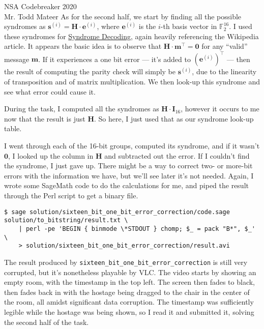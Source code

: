\documentclass{letter}
\begin{document}
\begin{letter}{NSA Codebreaker 2020\\Mr. Todd Mateer}
As for the second half, we start by finding all the possible syndromes as
\(\mathbf{s}^{(i)}=\mathbf{H}\cdot\mathbf{e}^{(i)}\), where \(\mathbf{e}^{(i)}\)
is the \(i\)-th basis vector in \(\mathbb{F}_2^{16}\). I used these syndromes
for \href{https://en.wikipedia.org/wiki/Decoding_methods#Syndrome_decoding}
{Syndrome Decoding}, again heavily referencing the Wikipedia article. It appears
the basic idea is to observe that \(\mathbf{H}\cdot\mathbf{m}^\top=\mathbf{0}\)
for any ``valid'' message \(\mathbf{m}\). If it experiences a one bit error ---
it's added to \((\mathbf{e}^{(i)})^\top\) --- then the result of computing the
parity check will simply be \(\mathbf{s}^{(i)}\), due to the linearity of
transposition and of matrix multiplication. We then look-up this syndrome and
see what error could cause it.


During the task, I computed all the syndromes as
\(\mathbf{H}\cdot\mathbf{I}_{16}\), however it occurs to me now that the result
is just \(\mathbf{H}\). So here, I just used that as our syndrome look-up table.


I went through each of the 16-bit groups, computed its syndrome, and if it
wasn't \(\mathbf{0}\), I looked up the column in \(\mathbf{H}\) and subtracted
out the error. If I couldn't find the syndrome, I just gave up. There might be a
way to correct two- or more-bit errors with the information we have, but we'll
see later it's not needed. Again, I wrote some SageMath code to do the
calculations for me, and piped the result through the Perl script to get a
binary file.
\begin{lstlisting}
$ sage solution/sixteen_bit_one_bit_error_correction/code.sage solution/to_bitstring/result.txt \
    | perl -pe 'BEGIN { binmode \*STDOUT } chomp; $_ = pack "B*", $_'                           \
    > solution/sixteen_bit_one_bit_error_correction/result.avi
\end{lstlisting}


The result produced by \texttt{sixteen\_bit\_one\_bit\_error\_correction} is
still very corrupted, but it's nonetheless playable by VLC. The video starts by
showing an empty room, with the timestamp in the top left. The screen then fades
to black, then fades back in with the hostage being dragged to the chair in the
center of the room, all amidst significant data corruption. The timestamp was
sufficiently legible while the hostage was being shown, so I read it and
submitted it, solving the second half of the task.



\end{letter}
\end{document}
